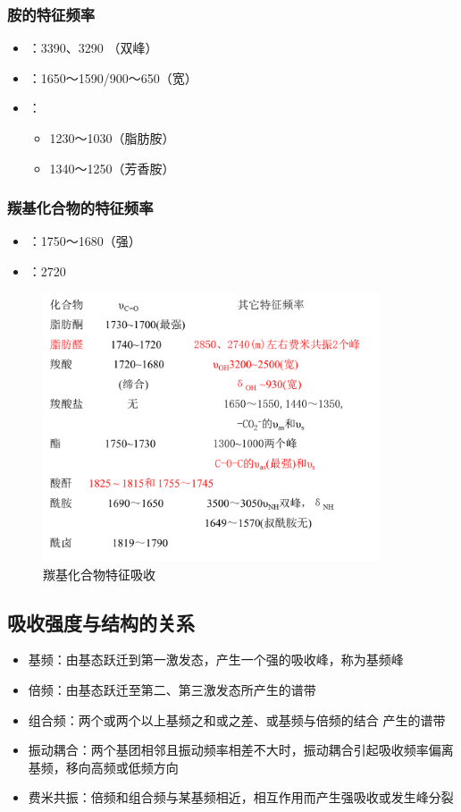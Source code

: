 \subsubsection*{胺的特征频率}
\begin{itemize}                  
	\item {}：3390、3290 （双峰）
	\item {}：1650～1590/900～650（宽）
	\item {}：
	\begin{itemize}
		\item 1230～1030（脂肪胺）
		\item 1340～1250（芳香胺）
	\end{itemize}
\end{itemize}
\subsubsection*{羰基化合物的特征频率}
\begin{itemize}  
	\item {}：1750～1680（强）
	\item {}：2720
\end{itemize}
\begin{figure}[ht]
	\centering
	\includegraphics[width=10cm]{image/chp5_co.png}
	\caption{羰基化合物特征吸收}
	\label{fig:chp5_co}
	
	
\end{figure}

\subsection{吸收强度与结构的关系}
\begin{itemize}
	\item 基频：由基态跃迁到第一激发态，产生一个强的吸收峰，称为基频峰
	\item 倍频：由基态跃迁至第二、第三激发态所产生的谱带
	\item 组合频：两个或两个以上基频之和或之差、或基频与倍频的结合 产生的谱带
	\item 振动耦合：两个基团相邻且振动频率相差不大时，振动耦合引起吸收频率偏离基频，移向高频或低频方向
	\item 费米共振：倍频和组合频与某基频相近，相互作用而产生强吸收或发生峰分裂
\end{itemize}

